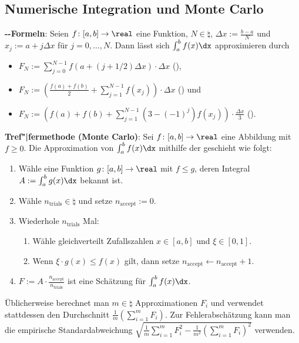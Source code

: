 \pagebreak

\subsection{%
    Numerische Integration und Monte Carlo%
}

\textbf{--Formeln}:
Seien $f\colon [a, b] \to \real$ eine Funktion, $N \in \natural$,
$\Delta x := \frac{b - a}{N}$ und $x_j := a + j \Delta x$ für $j = 0, \dotsc, N$.
Dann lässt sich $\int_a^b f(x) \dx$ approximieren durch
\begin{itemize}
    \item
    $F_N := \sum_{j=0}^{N-1} f(a + (j+1/2) \Delta x) \cdot \Delta x$
    (),

    \item
    $F_N := \left(\frac{f(a) + f(b)}{2} + \sum_{j=1}^{N-1} f(x_j)\right) \cdot \Delta x$
    () und

    \item
    $F_N := \left(f(a) + f(b) + \sum_{j=1}^{N-1} (3 - (-1)^j) f(x_j)\right)
    \cdot \frac{\Delta x}{3}$
    ().
\end{itemize}

\linie

\textbf{Tref"|fermethode (Monte Carlo)}:
Sei $f\colon [a, b] \to \real$ eine Abbildung mit $f \ge 0$.
Die Approximation von $\int_a^b f(x) \dx$ mithilfe der 
geschieht wie folgt:
\begin{enumerate}
    \item
    Wähle eine Funktion $g\colon [a, b] \to \real$ mit $f \le g$, deren Integral
    $A := \int_a^b g(x) \dx$ bekannt ist.

    \item
    Wähle $n_{\text{trials}} \in \natural$ und setze $n_{\text{accept}} := 0$.

    \item
    Wiederhole $n_{\text{trials}}$ Mal:
    \begin{enumerate}
        \item
        Wähle gleichverteilt Zufallszahlen $x \in [a, b]$ und $\xi \in [0, 1]$.

        \item
        Wenn $\xi \cdot g(x) \le f(x)$ gilt,
        dann setze $n_{\text{accept}} \leftarrow n_{\text{accept}} + 1$.
    \end{enumerate}

    \item
    $F := A \cdot \frac{n_{\text{accept}}}{n_{\text{trials}}}$ ist eine Schätzung für
    $\int_a^b f(x) \dx$.
\end{enumerate}
Üblicherweise berechnet man $m \in \natural$ Approximationen $F_i$ und
verwendet stattdessen den Durchschnitt $\frac{1}{m} (\sum_{i=1}^m F_i)$.
Zur Fehlerabschätzung kann man die empirische Standardabweichung
$\sqrt{\frac{1}{m} \sum_{i=1}^m F_i^2 - \frac{1}{m^2} (\sum_{i=1}^m F_i)^2}$ verwenden.

